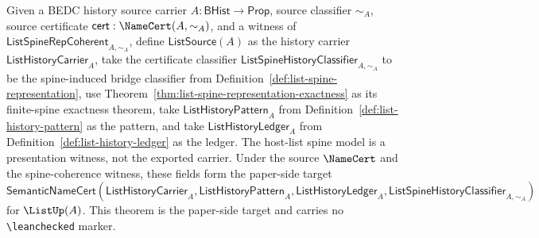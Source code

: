 \begin{theorem}
\label{thm:concrete-list-namecert}
Given a BEDC history source carrier $A : \mathsf{BHist} \to \mathsf{Prop}$,
source classifier $\sim_A$, source certificate
$\mathsf{cert} : \NameCert(A,\sim_A)$, and a witness of
$\mathsf{ListSpineRepCoherent}_{A,\sim_A}$, define
$\mathsf{ListSource}(A)$ as the history carrier
$\mathsf{ListHistoryCarrier}_A$, take the certificate classifier
$\mathsf{ListSpineHistoryClassifier}_{A,\sim_A}$ to be the spine-induced bridge
classifier from Definition~\ref{def:list-spine-representation}, use
Theorem~\ref{thm:list-spine-representation-exactness} as its finite-spine
exactness theorem, take $\mathsf{ListHistoryPattern}_A$ from
Definition~\ref{def:list-history-pattern} as the pattern, and take
$\mathsf{ListHistoryLedger}_A$ from Definition~\ref{def:list-history-ledger}
as the ledger. The host-list spine model is a presentation witness, not the exported carrier. Under the source $\NameCert$ and the spine-coherence witness,
these fields form the paper-side target
$\mathsf{SemanticNameCert}(\mathsf{ListHistoryCarrier}_A,\mathsf{ListHistoryPattern}_A,\mathsf{ListHistoryLedger}_A,\mathsf{ListSpineHistoryClassifier}_{A,\sim_A})$
for $\ListUp(A)$. This theorem is the paper-side target and carries no
\texttt{\textbackslash leanchecked} marker.
\end{theorem}
